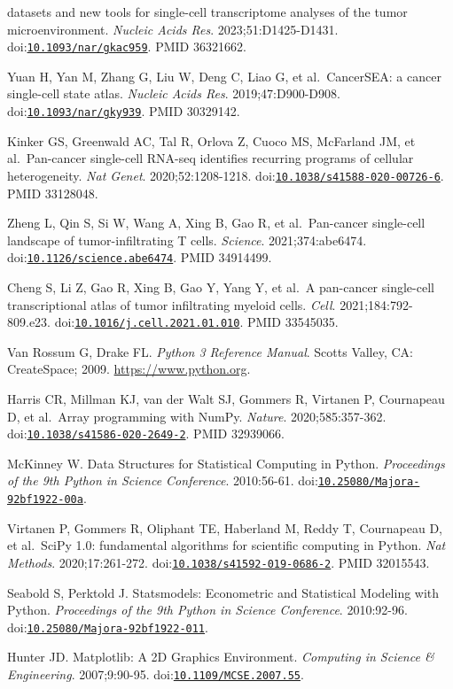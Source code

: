 \documentclass[11pt]{article}
\begin{document}
\begin{enumerate}[label={[\arabic*]},leftmargin=2.6em,labelsep=0.5em,itemsep=1.5pt]
  datasets and new tools for single-cell transcriptome analyses of the
  tumor microenvironment. \emph{Nucleic Acids Res}. 2023;51:D1425-D1431.
  doi:\href{https://doi.org/10.1093/nar/gkac959}{\nolinkurl{10.1093/nar/gkac959}}.
  PMID 36321662.
\item
  Yuan H, Yan M, Zhang G, Liu W, Deng C, Liao G, et al.~CancerSEA: a
  cancer single-cell state atlas. \emph{Nucleic Acids Res}.
  2019;47:D900-D908.
  doi:\href{https://doi.org/10.1093/nar/gky939}{\nolinkurl{10.1093/nar/gky939}}.
  PMID 30329142.
\item
  Kinker GS, Greenwald AC, Tal R, Orlova Z, Cuoco MS, McFarland JM, et
  al.~Pan-cancer single-cell RNA-seq identifies recurring programs of
  cellular heterogeneity. \emph{Nat Genet}. 2020;52:1208-1218.
  doi:\href{https://doi.org/10.1038/s41588-020-00726-6}{\nolinkurl{10.1038/s41588-020-00726-6}}.
  PMID 33128048.
\item
  Zheng L, Qin S, Si W, Wang A, Xing B, Gao R, et al.~Pan-cancer
  single-cell landscape of tumor-infiltrating T cells. \emph{Science}.
  2021;374:abe6474.
  doi:\href{https://doi.org/10.1126/science.abe6474}{\nolinkurl{10.1126/science.abe6474}}.
  PMID 34914499.
\item
  Cheng S, Li Z, Gao R, Xing B, Gao Y, Yang Y, et al.~A pan-cancer
  single-cell transcriptional atlas of tumor infiltrating myeloid cells.
  \emph{Cell}. 2021;184:792-809.e23.
  doi:\href{https://doi.org/10.1016/j.cell.2021.01.010}{\nolinkurl{10.1016/j.cell.2021.01.010}}.
  PMID 33545035.
\item
  Van Rossum G, Drake FL. \emph{Python 3 Reference Manual}. Scotts
  Valley, CA: CreateSpace; 2009. \url{https://www.python.org}.
\item
  Harris CR, Millman KJ, van der Walt SJ, Gommers R, Virtanen P,
  Cournapeau D, et al.~Array programming with NumPy. \emph{Nature}.
  2020;585:357-362.
  doi:\href{https://doi.org/10.1038/s41586-020-2649-2}{\nolinkurl{10.1038/s41586-020-2649-2}}.
  PMID 32939066.
\item
  McKinney W. Data Structures for Statistical Computing in Python.
  \emph{Proceedings of the 9th Python in Science Conference}.
  2010:56-61.
  doi:\href{https://doi.org/10.25080/Majora-92bf1922-00a}{\nolinkurl{10.25080/Majora-92bf1922-00a}}.
\item
  Virtanen P, Gommers R, Oliphant TE, Haberland M, Reddy T, Cournapeau
  D, et al.~SciPy 1.0: fundamental algorithms for scientific computing
  in Python. \emph{Nat Methods}. 2020;17:261-272.
  doi:\href{https://doi.org/10.1038/s41592-019-0686-2}{\nolinkurl{10.1038/s41592-019-0686-2}}.
  PMID 32015543.
\item
  Seabold S, Perktold J. Statsmodels: Econometric and Statistical
  Modeling with Python. \emph{Proceedings of the 9th Python in Science
  Conference}. 2010:92-96.
  doi:\href{https://doi.org/10.25080/Majora-92bf1922-011}{\nolinkurl{10.25080/Majora-92bf1922-011}}.
\item
  Hunter JD. Matplotlib: A 2D Graphics Environment. \emph{Computing in
  Science \& Engineering}. 2007;9:90-95.
  doi:\href{https://doi.org/10.1109/MCSE.2007.55}{\nolinkurl{10.1109/MCSE.2007.55}}.
\end{enumerate}
\endgroup
\end{document}

